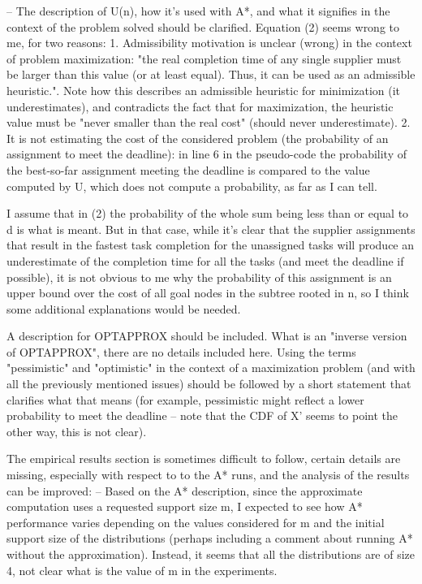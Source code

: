 -- The description of U(n), how it's used with A*, and what it signifies in the context of the problem solved should be clarified. Equation (2) seems wrong to me, for two reasons:
1. Admissibility motivation is unclear (wrong) in the context of problem maximization: "the real completion time of any single supplier must be larger than this value (or at least equal). Thus, it can be used as an admissible heuristic.". Note how this describes an admissible heuristic for minimization (it underestimates), and contradicts the fact that for maximization, the heuristic value must be "never smaller than the real cost" (should never underestimate).
2. It is not estimating the cost of the considered problem (the probability of an assignment to meet the deadline): in line 6 in the pseudo-code the probability of the best-so-far assignment meeting the deadline is compared to the value computed by U, which does not compute a probability, as far as I can tell.

I assume that in (2) the probability of the whole sum being less than or equal to d is what is meant. But in that case, while it's clear that the supplier assignments that result in the fastest task completion for the unassigned tasks will produce an underestimate of the completion time for all the tasks (and meet the deadline if possible), it is not obvious to me why the probability of this assignment is an upper bound over the cost of all goal nodes in the subtree rooted in n, so I think some additional explanations would be needed.

A description for OPTAPPROX should be included. What is an "inverse version of OPTAPPROX", there are no details included here.
Using the terms "pessimistic" and "optimistic" in the context of a maximization problem (and with all the previously mentioned issues) should be followed by a short statement that clarifies what that means (for example, pessimistic might reflect a lower probability to meet the deadline -- note that the CDF of X' seems to point the other way, this is not clear).

The empirical results section is sometimes difficult to follow, certain details are missing, especially with respect to to the A* runs, and the analysis of the results can be improved:
-- Based on the A* description, since the approximate computation uses a requested support size m, I expected to see how A* performance varies depending on the values considered for m and the initial support size of the distributions (perhaps including a comment about running A* without the approximation). Instead, it seems that all the distributions are of size 4, not clear what is the value of m in the experiments.

